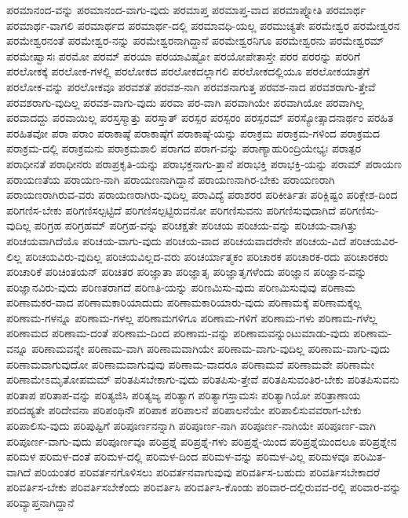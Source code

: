 {ಪರಮಾನಂದ-ವನ್ನು
ಪರಮಾನಂದ-ವಾಗು-ವುದು
ಪರಮಾಪ್ತ
ಪರಮಾಪ್ತ-ವಾದ
ಪರಮಾಪ್ನೋತಿ
ಪರಮಾರ್ಥ
ಪರಮಾರ್ಥ-ವಾಗಲಿ
ಪರಮಾರ್ಥದ
ಪರಮಾರ್ಥ-ದಲ್ಲಿ
ಪರಮಾವಧಿ-ಯಲ್ಲ
ಪರಮುಚ್ಯತೇ
ಪರಮೇಶ್ವರ
ಪರಮೇಶ್ವರನ
ಪರಮೇಶ್ವರನಂತೆ
ಪರಮೇಶ್ವರ-ನನ್ನು
ಪರಮೇಶ್ವರನಾಗಿದ್ದಾನೆ
ಪರಮೇಶ್ವರನಿಗೂ
ಪರಮೇಶ್ವರನು
ಪರಮೇಶ್ವರಮ್
ಪರಮೇಷ್ವಾಸಃ
ಪರಮೋ
ಪರಮ್
ಪರಯಾ
ಪರಯಾವಿಷ್ಟೋ
ಪರಯೋಪೇತಾಸ್ತೇ
ಪರರ
ಪರರನ್ನು
ಪರರಿಗೆ
ಪರಲೋಕಕ್ಕೆ
ಪರಲೋಕ-ಗಳಲ್ಲಿ
ಪರಲೋಕದ
ಪರಲೋಕದಲ್ಲಾಗಲಿ
ಪರಲೋಕದಲ್ಲಿಯೂ
ಪರಲೋಕಯಾತ್ರೆಗೆ
ಪರಲೋಕ-ವನ್ನು
ಪರಲೋಕವೂ
ಪರವಶತೆ
ಪರವಶ-ನಾಗಿ
ಪರವಶನಾಗುತ್ತ
ಪರವಶ-ನಾದ
ಪರವಶರಾಗು-ತ್ತೇವೆ
ಪರವಶರಾಗು-ವುದಿಲ್ಲ
ಪರವಶ-ವಾಗು-ವುದು
ಪರವಾ
ಪರ-ವಾಗಿ
ಪರವಾಗಿಯೇ
ಪರವಾಗಿಯೋ
ಪರವಾಗಿಲ್ಲ
ಪರವಾದದ್ದು
ಪರವಾಯಿಲ್ಲ
ಪರಸ್ತಸ್ಮಾತ್ತು
ಪರಸ್ತಾತ್
ಪರಸ್ಪರ
ಪರಸ್ಪರಂ
ಪರಸ್ಪರಮ್
ಪರಸ್ಯೋತ್ಸಾದನಾರ್ಥಂ
ಪರಹಿತ
ಪರಹಿತವೋ
ಪರಾ
ಪರಾಂ
ಪರಾಕಾಷ್ಠೆ
ಪರಾಕಾಷ್ಠೆಗೆ
ಪರಾಕಾಷ್ಠೆ-ಯನ್ನು
ಪರಾಕ್ರಮ
ಪರಾಕ್ರಮ-ಗಳಿಂದ
ಪರಾಕ್ರಮದ
ಪರಾಕ್ರಮ-ದಲ್ಲಿ
ಪರಾಕ್ರಮನು
ಪರಾಕ್ರಮಶಾಲಿ
ಪರಾಗದ
ಪರಾಗ-ವನ್ನು
ಪರಾಣ್ಯಾಹುರಿಂದ್ರಿಯೇಭ್ಯಃ
ಪರಾತ್ಪರ
ಪರಾಧೀನತೆ
ಪರಾಧೀನರು
ಪರಾಪ್ರಕೃತಿ-ಯನ್ನು
ಪರಾಭಕ್ತನಾಗು-ತ್ತಾನೆ
ಪರಾಭಕ್ತಿ
ಪರಾಭಕ್ತಿ-ಯನ್ನು
ಪರಾಮ್
ಪರಾಯಣ
ಪರಾಯಣತೆಯ
ಪರಾಯಣ-ನಾಗಿ
ಪರಾಯಣನಾಗಿದ್ದಾನೆ
ಪರಾಯಣನಾಗಿರ-ಬೇಕು
ಪರಾಯಣರಾಗಿ
ಪರಾಯಣರಾಗಿರುವ-ವರು
ಪರಾಯಣರಾಗಿರು-ವುದಿಲ್ಲ
ಪರಾವಿದ್ಯೆ
ಪರಾಶರರ
ಪರಿಕೀರ್ತಿತಃ
ಪರಿಕ್ಲಿಷ್ಟಂ
ಪರಿಕ್ಲೇಶ-ದಿಂದ
ಪರಿಗಣಿಸ-ಬೇಕು
ಪರಿಗಣಿಸಲ್ಪಟ್ಟಿದೆ
ಪರಿಗಣಿಸಲ್ಪಟ್ಟಿರುವನೋ
ಪರಿಗಣಿಸುವನು
ಪರಿಗಣಿಸುವುದಾಗಿದೆ
ಪರಿಗಣಿಸು-ವುದಿಲ್ಲ
ಪರಿಗ್ರಹ
ಪರಿಗ್ರಹಮ್
ಪರಿಗ್ರಹ-ವನ್ನು
ಪರಿಚಕ್ಷತೇ
ಪರಿಚಯ
ಪರಿಚಯ-ವನ್ನು
ಪರಿಚಯ-ವಾಗಿತ್ತು
ಪರಿಚಯವಾಗಿದೆಯೊ
ಪರಿಚಯ-ವಾಗು-ವುದು
ಪರಿಚಯ-ವಾದ
ಪರಿಚಯವಾದರೇನೇ
ಪರಿಚಯ-ವಿದೆ
ಪರಿಚಯವಿರ-ಲಿಲ್ಲ
ಪರಿಚಯವಿರು-ವುದಿಲ್ಲ
ಪರಿಚಯವಿಲ್ಲದ-ವರು
ಪರಿಚರ್ಯಾತ್ಮಕಂ
ಪರಿಚಾರಕ
ಪರಿಚಾರಕ-ರದು
ಪರಿಚಾರಕರು
ಪರಿಚಾರಿಕೆ
ಪರಿಚಿಂತಯನ್
ಪರಿಚಿತರ
ಪರಿಜ್ಞಾತಾ
ಪರಿಜ್ಞಾತೃ
ಪರಿಜ್ಞಾತೃಗಳೆಂದು
ಪರಿಜ್ಞಾನ
ಪರಿಜ್ಞಾನ-ವನ್ನು
ಪರಿಜ್ಞಾನವಿರು-ವುದು
ಪರಿಣತರಾಗದೆ
ಪರಿಣತಿ-ಯನ್ನು
ಪರಿಣಮಿಸು-ವುದು
ಪರಿಣಮಿಸುವುವು
ಪರಿಣಾಮ
ಪರಿಣಾಮಕರ-ವಾದ
ಪರಿಣಾಮಕಾರಿಯಾದುದು
ಪರಿಣಾಮಕಾರಿಯಾರು-ವುದು
ಪರಿಣಾಮಕ್ಕೆ
ಪರಿಣಾಮಕ್ಕೆಲ್ಲ
ಪರಿಣಾಮ-ಗಳನ್ನೂ
ಪರಿಣಾಮ-ಗಳಲ್ಲ
ಪರಿಣಾಮಗಳಿಗೂ
ಪರಿಣಾಮ-ಗಳಿಗೆ
ಪರಿಣಾಮ-ಗಳು
ಪರಿಣಾಮ-ಗಳೆಲ್ಲ
ಪರಿಣಾಮದ
ಪರಿಣಾಮ-ದಂತೆ
ಪರಿಣಾಮ-ದಿಂದ
ಪರಿಣಾಮ-ವನ್ನು
ಪರಿಣಾಮವನ್ನುಂಟುಮಾಡು-ವುದು
ಪರಿಣಾಮ-ವನ್ನೂ
ಪರಿಣಾಮವನ್ನೇ
ಪರಿಣಾಮ-ವಾಗಿ
ಪರಿಣಾಮವಾಗಿಯೇ
ಪರಿಣಾಮ-ವಾಗು-ವುದಿಲ್ಲ
ಪರಿಣಾಮ-ವಾಗು-ವುದು
ಪರಿಣಾಮವಾಗುವುದೋ
ಪರಿಣಾಮವಾಗುವುವು
ಪರಿಣಾಮ-ವಾದರೂ
ಪರಿಣಾಮವೆ
ಪರಿಣಾಮವೇ
ಪರಿಣಾಮೇ
ಪರಿಣಾಮೇಽಮೃತೋಪಮಮ್
ಪರಿತಪಿಸಬೇಕಾಗು-ವುದು
ಪರಿತಪಿಸು-ತ್ತೇವೆ
ಪರಿತಪಿಸುವಂತಿರ-ಬೇಕು
ಪರಿತಪಿಸುವನು
ಪರಿತಾಪ
ಪರಿತಾಪ-ವನ್ನು
ಪರಿತ್ಯಜಿಸಿ
ಪರಿತ್ಯಜ್ಯ
ಪರಿತ್ಯಾಗ
ಪರಿತ್ಯಾಗಸ್ತಾಮಸಃ
ಪರಿತ್ಯಾಗಿಯೋ
ಪರಿತ್ರಾಣಾಯ
ಪರಿದಹ್ಯತೇ
ಪರಿದೇವನಾ
ಪರಿಪಂಥಿನೌ
ಪರಿಪಾಕ
ಪರಿಪಾಲನೆ
ಪರಿಪಾಲನೆಯೇ
ಪರಿಪಾಲಿಸುವವರಾಗ-ಬೇಕು
ಪರಿಪಾಲಿಸು-ವುದು
ಪರಿಪುಷ್ಟಿಗೆ
ಪರಿಪೂರ್ಣನನ್ನಾಗಿ
ಪರಿಪೂರ್ಣ-ನಾಗಿ
ಪರಿಪೂರ್ಣ-ನಾಗಿಯೇ
ಪರಿಪೂರ್ಣ-ವಾಗಿ
ಪರಿಪೂರ್ಣ-ವಾಗು-ವುದು
ಪರಿಪೂರ್ಣವೂ
ಪರಿಪ್ರಶ್ನೆ
ಪರಿಪ್ರಶ್ನೆ-ಗಳು
ಪರಿಪ್ರಶ್ನೆ-ಯಿಂದ
ಪರಿಪ್ರಶ್ನೆಯಿಂದಲೂ
ಪರಿಪ್ರಶ್ನೇನ
ಪರಿಮಳ
ಪರಿಮಳ-ದಂತೆ
ಪರಿಮಳ-ದಲ್ಲಿ
ಪರಿಮಳ-ದಿಂದ
ಪರಿಮಳ-ವನ್ನು
ಪರಿಮಳ-ವಿಲ್ಲ
ಪರಿಮಳವೂ
ಪರಿಮಿತ-ವಾಗಿದೆ
ಪರಿಯಂತರ
ಪರಿವರ್ತನಗೊಳಿಸಲು
ಪರಿವರ್ತನವಾಗುವುವು
ಪರಿವರ್ತಿಸ-ಬಹುದು
ಪರಿವರ್ತಿಸಬೇಕಾದರೆ
ಪರಿವರ್ತಿಸ-ಬೇಕು
ಪರಿವರ್ತಿಸಬೇಕೆಂದು
ಪರಿವರ್ತಿಸಿ
ಪರಿವರ್ತಿಸಿ-ಕೊಂಡು
ಪರಿವಾರ-ದಲ್ಲಿರುವವ-ರಲ್ಲಿ
ಪರಿವಾರ-ವನ್ನು
ಪರಿವ್ಯಾಪ್ತನಾಗಿದ್ದಾನೆ
}
